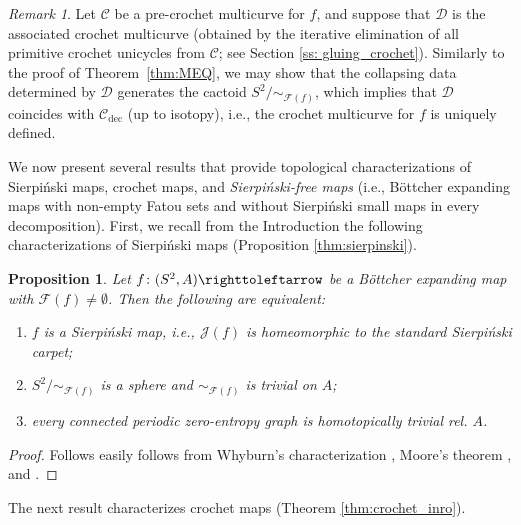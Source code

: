 \documentclass{amsart}
\theoremstyle{plain}
\newtheorem{proposition}[theorem]{Proposition}
\theoremstyle{definition}
\theoremstyle{remark}
\newtheorem{rem}[theorem]{Remark}
\newcommand{\reminder}[1]{\textsl{$\lhd\rhd$#1$\lhd\rhd$}\marginpar{$\lhd\rhd\lhd\rhd\lhd\rhd$}}%
\newcommand{\hide}[1]{}
\newcommand{\Fat}{{\mathcal F}}
\newcommand{\Jul}{{\mathcal J}}
\newcommand{\CC}{{\mathcal C}}
\newcommand{\DD}{{\mathcal D}}
\newcommand\selfmap{\righttoleftarrow}
\newcommand{\cro}{{\operatorname{dec}}}
\begin{document}
\begin{rem}\label{rem: crochet_multicurve_unique} Let $\CC$ be a pre-crochet multicurve for $f$, and suppose that $\DD$ is the associated crochet multicurve (obtained by the iterative elimination of all primitive crochet unicycles from $\CC$; see Section \ref{ss: gluing_crochet}). Similarly to the proof of Theorem~\ref{thm:MEQ}, we may show that the collapsing data determined by $\DD$ generates the cactoid $S^2/\sim_{\Fat(f)}$, which implies that $\DD$ coincides with $\CC_\cro$ (up to isotopy), i.e., the crochet multicurve for $f$ is uniquely defined.  
\end{rem}




We now present several results that provide topological characterizations of Sierpi\'{n}ski maps,  crochet maps,  and \emph{Sierpi\'{n}ski-free maps} (i.e., B\"{o}ttcher expanding maps with non-empty Fatou sets and without  Sierpi\'{n}ski small maps in every decomposition).  First, we recall from the Introduction the following characterizations of Sierpi\'{n}ski maps (Proposition \ref{thm:sierpinski}).



\begin{proposition}
\label{prop:sierpinski}
Let $f\colon(S^2,A)\selfmap$ be a B\"ottcher expanding map with $\Fat(f)\not=\emptyset$. Then the following are equivalent:
\begin{enumerate}[label=\text{(\roman*)},font=\normalfont,leftmargin=*]
\item $f$ is a Sierpi\'{n}ski map, i.e., $\Jul(f)$ is homeomorphic to the standard Sierpi\'{n}ski carpet;
\item $S^2/\sim_{\Fat(f)}$ is a sphere and $\sim_{\Fat(f)}$ is trivial on $A$;
\item every connected periodic zero-entropy graph is homotopically trivial rel.  $A$. 
\end{enumerate}
\end{proposition}
\begin{proof}
 Follows easily follows from Whyburn's characterization \cite{Why}, Moore's theorem \cite{Moore,WhyBook}, and \cite[Section~4.5]{BD_Exp}.
\end{proof}


The next result characterizes crochet maps (Theorem \ref{thm:crochet_inro}).



\end{document}
